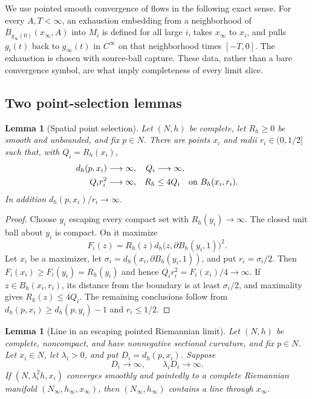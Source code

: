 \documentclass[10pt]{coll-l}
\newtheorem{lemma}[theorem]{Lemma}
\theoremstyle{definition}
\theoremstyle{remark}
\numberwithin{section}{chapter}
\numberwithin{equation}{chapter}
\begin{document}
We use pointed smooth convergence of flows in the following exact sense.
For every $A,T<\infty$, an exhaustion embedding from a neighborhood of
$\overline B_{g_\infty(0)}(x_\infty,A)$ into $M_i$ is defined for all large
$i$, takes $x_\infty$ to $x_i$, and pulls $g_i(t)$ back to $g_\infty(t)$ in
$C^\infty$ on that neighborhood times $[-T,0]$.  The exhaustion is chosen
with source-ball capture.  These data, rather than a bare convergence
symbol, are what imply completeness of every limit slice.

\subsection{Two point-selection lemmas}

\begin{lemma}[Spatial point selection]
\label{lem:ksol-spatial-point-selection}
Let $(N,h)$ be complete, let $R_h\geq0$ be smooth and unbounded, and fix
$p\in N$.  There are points $x_i$ and radii $r_i\in(0,1/2]$ such that, with
$Q_i=R_h(x_i)$,
\begin{align}
 d_h(p,x_i)&\longrightarrow\infty,& Q_i&\longrightarrow\infty,
                                                        \label{eq:ksol-pointpick-escape}\\
 Q_ir_i^2&\longrightarrow\infty,&
 R_h&\leq4Q_i\quad\hbox{on }B_h(x_i,r_i).              \label{eq:ksol-pointpick-control}
\end{align}
In addition $d_h(p,x_i)/r_i\to\infty$.
\end{lemma}

\begin{proof}
Choose $y_i$ escaping every compact set with $R_h(y_i)\to\infty$.  The
closed unit ball about $y_i$ is compact.  On it maximize
\[
       F_i(z)=R_h(z)d_h\bigl(z,\partial B_h(y_i,1)\bigr)^2.
\]
Let $x_i$ be a maximizer, let
$\sigma_i=d_h(x_i,\partial B_h(y_i,1))$, and put $r_i=\sigma_i/2$.
Then $F_i(x_i)\geq F_i(y_i)=R_h(y_i)$ and hence
$Q_ir_i^2=F_i(x_i)/4\to\infty$.  If $z\in B_h(x_i,r_i)$, its distance from
the boundary is at least $\sigma_i/2$, and maximality gives
$R_h(z)\leq4Q_i$.  The remaining conclusions follow from
$d_h(p,x_i)\geq d_h(p,y_i)-1$ and $r_i\leq1/2$.
\end{proof}

\begin{lemma}[Line in an escaping pointed Riemannian limit]
\label{lem:ksol-Riemannian-line-limit}
Let $(N,h)$ be complete, noncompact, and have nonnegative sectional
curvature, and fix $p\in N$.  Let $x_i\in N$, let $\lambda_i>0$, and put
$D_i=d_h(p,x_i)$.  Suppose
\begin{equation}
                    D_i\longrightarrow\infty,\qquad
                    \lambda_iD_i\longrightarrow\infty.       \label{eq:ksol-Riemannian-line-hypotheses}
\end{equation}
If $(N,\lambda_i^2h,x_i)$ converges smoothly and pointedly to a complete
Riemannian manifold $(N_\infty,h_\infty,x_\infty)$, then
$(N_\infty,h_\infty)$ contains a line through $x_\infty$.
\end{lemma}
\end{document}
